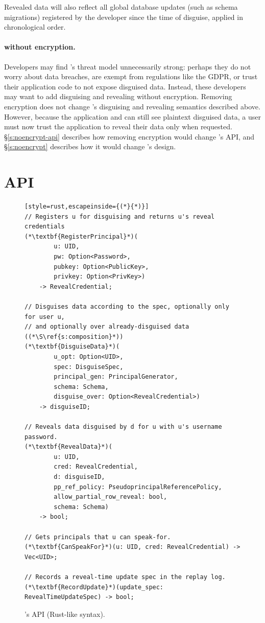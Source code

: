 Revealed data will also reflect all global database updates (such as schema
migrations) registered by the developer since the time of disguise, applied in
chronological order.


\paragraph{\sys without encryption.}
\label{s:semantics:noencrypt}

Developers may find \sys's threat model unnecessarily strong: perhaps they do
not worry about data breaches, are exempt from regulations like the GDPR, or
trust their application code to not expose disguised data. Instead, these
developers may want to add disguising and revealing without encryption.
%
Removing encryption does not change \sys's disguising and revealing semantics
described above.
However, because the application and \sys can still see plaintext disguised
data, a user must now trust the application to reveal their data only when 
requested. 
%
\S\ref{s:noencrypt-api} describes how removing encryption would change \sys's
API, and \S\ref{s:noencrypt} describes how it would change
\sys's design.


\section{API}
\label{s:api}


\begin{figure}[t]
\begin{lstlisting}[style=rust,escapeinside={(*}{*)}]
// Registers u for disguising and returns u's reveal credentials 
(*\textbf{RegisterPrincipal}*)(
        u: UID, 
        pw: Option<Password>,
        pubkey: Option<PublicKey>, 
        privkey: Option<PrivKey>)
    -> RevealCredential;

// Disguises data according to the spec, optionally only for user u, 
// and optionally over already-disguised data ((*\S\ref{s:composition}*))
(*\textbf{DisguiseData}*)(
        u_opt: Option<UID>, 
        spec: DisguiseSpec,
        principal_gen: PrincipalGenerator,
        schema: Schema,
        disguise_over: Option<RevealCredential>) 
    -> disguiseID;

// Reveals data disguised by d for u with u's username password. 
(*\textbf{RevealData}*)(
        u: UID, 
        cred: RevealCredential,
        d: disguiseID, 
        pp_ref_policy: PseudoprincipalReferencePolicy,
        allow_partial_row_reveal: bool,
        schema: Schema)
    -> bool;

// Gets principals that u can speak-for.
(*\textbf{CanSpeakFor}*)(u: UID, cred: RevealCredential) -> Vec<UID>;

// Records a reveal-time update spec in the replay log.
(*\textbf{RecordUpdate}*)(update_spec: RevealTimeUpdateSpec) -> bool;
\end{lstlisting}
\caption{\sys's API (Rust-like syntax).}
\label{f:api-high}
\end{figure}
%

